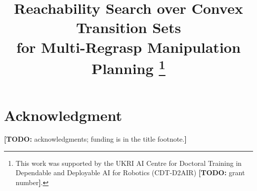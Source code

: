 \documentclass[conference]{IEEEtran}
\newcommand{\todo}[1]{{\color{red}\textbf{[TODO:} #1\textbf{]}}}
\newcommand{\todo}[1]{}
\begin{document}
\title{Reachability Search over Convex Transition Sets\\
for Multi-Regrasp Manipulation Planning%
\thanks{This work was supported by the UKRI AI Centre for Doctoral Training in
Dependable and Deployable AI for Robotics (CDT-D2AIR) \todo{grant number}.}}

\author{
}

\maketitle










\clearpage   %

\section*{Acknowledgment}
\todo{acknowledgments; funding is in the title footnote.}



\end{document}
